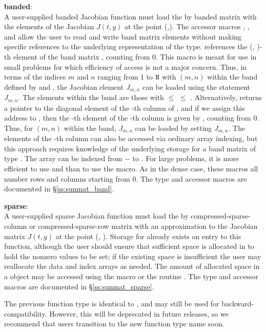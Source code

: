 {  {\bf banded}:\\
  A user-supplied banded Jacobian function must load the  by  banded matrix
   with the elements of the Jacobian $J(t,y)$ at the point
  (,).  The accessor macros ,
  , and  allow the user
  to read and write band matrix elements without making specific
  references to the underlying representation of the {\sunmatband}
  type.   references the (,
  )-th element of the band matrix , counting from $0$.
  This macro is meant for use in small problems for which efficiency
  of access is not a major concern.  Thus, in terms of the indices $m$
  and $n$ ranging from $1$ to ${\tt N}$ with $(m,n)$ within the band defined
  by  and , the Jacobian element $J_{m,n}$ can
  be loaded using the statement 
  $J_{m,n}$. The elements within the band are those with 
  $\le$  $\le$ . Alternatively,
   returns a pointer to the diagonal element
  of the -th column of , and if we assign this address
  to , then the -th element of the
  -th column is given by
  , counting from $0$.  Thus,
  for $(m,n)$ within the band, $J_{m,n}$ can be loaded by setting
   $J_{m,n}$.  The
  elements of the -th column can also be accessed via ordinary
  array indexing, but this approach requires knowledge of the
  underlying storage for a band matrix of type {\sunmatband}.
  The array  can be indexed from $-$ to
  . For large problems, it is more efficient to use
   and  than to use the
   macro.  As in the dense case, these macros all
  number rows and columns starting from $0$.  The {\sunmatband} type
  and accessor macros are documented in \S\ref{ss:sunmat_band}.

  {\bf sparse}:\\
  A user-supplied sparse Jacobian function must load the  by 
  compressed-sparse-column or compressed-sparse-row matrix 
  with an approximation to the Jacobian matrix $J(t,y)$ at the point
  (, ).  Storage for  already exists on entry to
  this function, although the user should ensure that sufficient space
  is allocated in  to hold the nonzero values to be set; if
  the existing space is insufficient the user may reallocate the data
  and index arrays as needed.  The amount of allocated space in a
  {\sunmatsparse} object may be accessed using the macro
   or the routine .  The
  {\sunmatsparse} type and accessor macros are documented in
  \S\ref{ss:sunmat_sparse}.

  The previous function type  is identical to
  , and may still be used for backward-compatibility.
  However, this will be deprecated in future releases, so we recommend
  that users transition to the new function type name soon.
}
